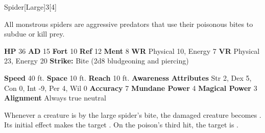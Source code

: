   \begin{monsection}{Spider}[Large]{3}[4]
    \vspace{-1em}\vspace{-1em}
    \vspace{0em}

    
    All monstrous spiders are aggressive predators that use their poisonous bites to subdue or kill prey.
  
    

    \begin{spellcontent}
      \begin{spelltargetinginfo}
        \pari \textbf{HP} 36 \monsep
          \textbf{AD} 15 \monsep
          \textbf{Fort} 10 \monsep
          \textbf{Ref} 12 \monsep
          \textbf{Ment} 8
        \pari \textbf{WR} Physical 10, Energy 7 \monsep
        \textbf{VR} Physical 23, Energy 20
        \pari \textbf{Strike:}
            Bite  (2d8 bludgeoning and piercing)
      \end{spelltargetinginfo}
    \end{spellcontent}
    \begin{monsterfooter}
      \pari \textbf{Speed} 40 ft. \monsep
        \textbf{Space} 10 ft. \monsep
        \textbf{Reach} 10 ft.
      \pari \textbf{Awareness} 
      \pari \textbf{Attributes}
        Str 2, Dex 5,
        Con 0, Int -9,
        Per 4, Wil 0
      \pari \textbf{Accuracy} 7 \monsep
        \textbf{Mundane Power} 4 \monsep
      \textbf{Magical Power} 3
      \pari \textbf{Alignment} Always true neutral
    \end{monsterfooter}
  \end{monsection}
    Whenever a creature is  by the large spider's bite,
      the damaged creature becomes .
    Its initial effect makes the target .
    On the poison's third hit, the target is .
  
